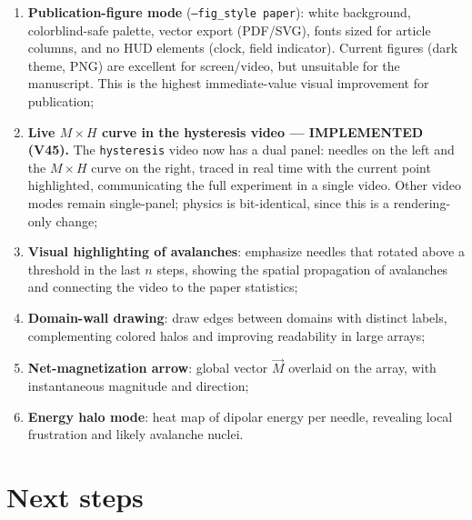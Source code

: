 \documentclass[11pt,a4paper]{article}
\newcommand{\code}[1]{\texttt{#1}}
\begin{document}
\begin{enumerate}
\item \textbf{Publication-figure mode} (\code{--fig\_style paper}): white background, colorblind-safe palette, vector export (PDF/SVG), fonts sized for article columns, and no HUD elements (clock, field indicator). Current figures (dark theme, PNG) are excellent for screen/video, but unsuitable for the manuscript. This is the highest immediate-value visual improvement for publication;
\item \textbf{Live $M\times H$ curve in the hysteresis video --- IMPLEMENTED (V45).} The \code{hysteresis} video now has a dual panel: needles on the left and the $M\times H$ curve on the right, traced in real time with the current point highlighted, communicating the full experiment in a single video. Other video modes remain single-panel; physics is bit-identical, since this is a rendering-only change;
\item \textbf{Visual highlighting of avalanches}: emphasize needles that rotated above a threshold in the last $n$ steps, showing the spatial propagation of avalanches and connecting the video to the paper statistics;
\item \textbf{Domain-wall drawing}: draw edges between domains with distinct labels, complementing colored halos and improving readability in large arrays;
\item \textbf{Net-magnetization arrow}: global vector $\vec M$ overlaid on the array, with instantaneous magnitude and direction;
\item \textbf{Energy halo mode}: heat map of dipolar energy per needle, revealing local frustration and likely avalanche nuclei.
\end{enumerate}

\section{Next steps}
\end{document}
